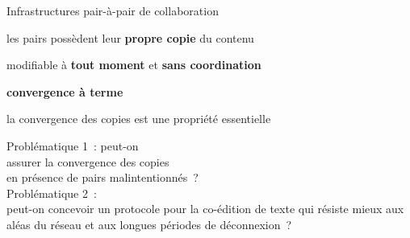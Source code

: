 \begin{frame}{Infrastructures pair-à-pair de collaboration}
\begin{minipage}{\textwidth}
\begin{compactitemize}
            \item les pairs possèdent leur \textbf{propre copie} du contenu
            \begin{compactitemize}
                \item modifiable à \textbf{tout moment} et \textbf{sans coordination}
                \item \textbf{convergence à terme}
            \end{compactitemize}
            \item la convergence des copies est une propriété essentielle
        \end{compactitemize}
    \end{minipage}
\end{frame}




\begin{frame}
    Problématique 1~: peut-on\\assurer la convergence des copies\\ en présence de pairs malintentionnés~?\\
    \vspace{2em}
    Problématique 2~:\\peut-on concevoir un protocole pour la co-édition de texte qui résiste mieux aux aléas du réseau et aux longues périodes de déconnexion~?\\
\end{frame}

